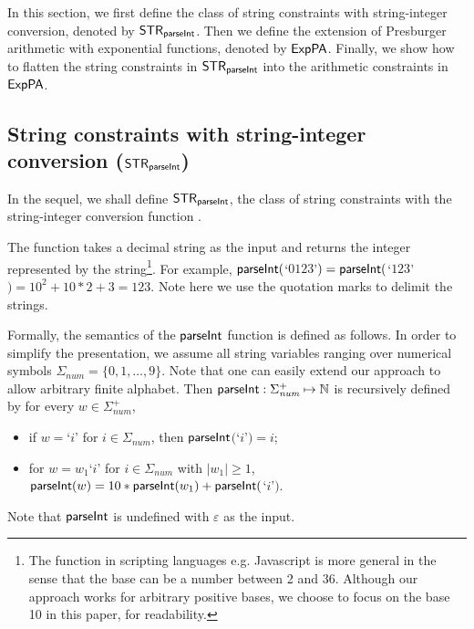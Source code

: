 
In this section, we first define the class of string constraints with string-integer conversion, denoted by ${\sf STR}_{\textsf{parseInt}}$. Then we define the extension of Presburger arithmetic with exponential functions, denoted by ${\sf ExpPA}$. Finally, we show how to flatten the string constraints in ${\sf STR}_{\textsf{parseInt}}$ into the arithmetic constraints in ${\sf ExpPA}$.

\subsection{String constraints with string-integer conversion (${\sf STR}_{\textsf{parseInt}}$)}

In the sequel, we shall define ${\sf STR}_{\textsf{parseInt}}$, the class of string constraints with the string-integer conversion function {\parseInt}.

The function  {\parseInt} takes a decimal string as the input and returns the integer represented by the string\footnote{The {\parseInt} function in scripting languages e.g. Javascript is more general in the sense that the base can be a number between 2 and 36. Although our approach works for arbitrary positive bases, we choose to focus on the base 10 in this paper, for readability.}.
For example,
${\textsf{parseInt}}($`$0123$'$) = {\textsf{parseInt}}($`$123$'$)=10^2+10*2+3 = 123$. 
Note here we use the quotation marks to delimit the strings.

Formally, the semantics of the $\textsf{parseInt}$ function is defined as follows. 
In order to simplify the presentation, we assume all string variables ranging over numerical symbols $\Sigma_{\textit{num}}=\{0,1, \ldots, 9\}$. Note that one can easily extend our approach to allow arbitrary finite alphabet. Then ${\textsf{parseInt}}: \Sigma_{\textit{num}}^+ \mapsto \mathbb{N}$ is recursively defined by
    for every $w\in \Sigma_{\textit{num}}^+$,
    \begin{itemize}
        \item  if $w=$`$i$' for $i \in \Sigma_{\textit{num}}$, then ${\textsf{parseInt}}$$($`$i$'$)=i$;
        \item for $w = w_1$`$i$' for $i \in \Sigma_{\textit{num}}$ with $|w_1| \ge 1$, 
        ${\textsf{parseInt}}(w) = 10*{\textsf{parseInt}}(w_1)+{\textsf{parseInt}}($`$i$'$)$.
    \end{itemize} 
Note that $\textsf{parseInt}$ is undefined with $\varepsilon$ as the input.


